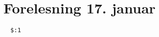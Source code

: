 \section{Forelesning 17. januar} %
\label{sec:forelesning_17_januar}

\begin{lstlisting}
  $:1
\end{lstlisting}

